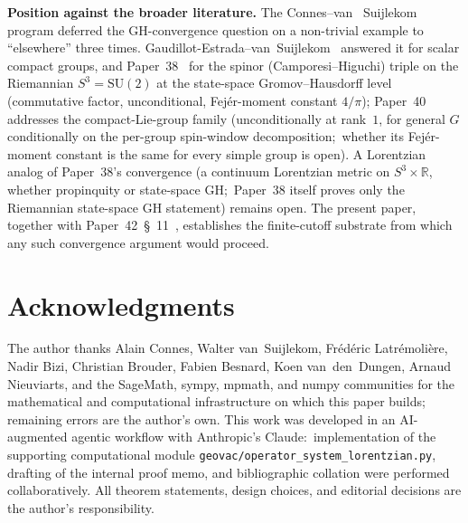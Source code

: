 \documentclass[11pt,a4paper]{article}
\theoremstyle{plain}
\theoremstyle{definition}
\newcommand{\sthree}{S^{3}}
\newcommand{\R}{\mathbb{R}}
\newcommand{\SU}{\mathrm{SU}}
\begin{document}
\medskip\noindent
\textbf{Position against the broader literature.} The Connes--van~%
Suijlekom~\cite{connes_vs2021} program deferred the GH-convergence
question on a non-trivial example to ``elsewhere'' three times.
Gaudillot-Estrada--van~Suijlekom~\cite{gaudillot_vs2025} answered it for
scalar compact groups, and Paper~38~\cite{paper38} for the spinor
(Camporesi--Higuchi) triple on the Riemannian $\sthree = \SU(2)$ at the
state-space Gromov--Hausdorff level (commutative factor, unconditional, Fej\'er-moment
constant $4/\pi$); Paper~40~\cite{paper40_unified} addresses the compact-Lie-group
family (unconditionally at rank~$1$, for general $G$ conditionally on the
per-group spin-window decomposition;\ whether its Fej\'er-moment constant
is the same for every simple group is open). A Lorentzian analog of Paper~38's
convergence (a continuum Lorentzian metric on $\sthree \times \R$, whether
propinquity or state-space GH;\ Paper~38 itself proves only the
Riemannian state-space GH statement) remains open. The present paper, together with
Paper~42~\S~11~\cite{paper42}, establishes the finite-cutoff substrate from
which any such convergence argument would proceed.

\section*{Acknowledgments}
The author thanks Alain Connes, Walter van~Suijlekom, Fr\'ed\'eric
Latr\'emoli\`ere, Nadir Bizi, Christian Brouder, Fabien Besnard,
Koen van~den~Dungen, Arnaud Nieuviarts, and the SageMath, sympy,
mpmath, and numpy communities for the mathematical and computational
infrastructure on which this paper builds; remaining errors are the
author's own. This work was developed in an AI-augmented agentic
workflow with Anthropic's Claude:\ implementation of the supporting
computational module
\texttt{geovac/operator\_system\_lorentzian.py}, drafting of the
internal proof memo, and
bibliographic collation were performed collaboratively. All
theorem statements, design choices, and editorial decisions are the
author's responsibility.
\end{document}
